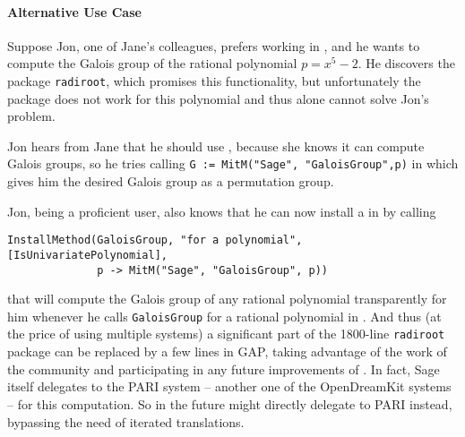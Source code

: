 \paragraph{Alternative Use Case}
Suppose Jon, one of Jane's colleagues, prefers working in \GAP, and he wants to
compute the Galois group of the rational polynomial $p = x^5 - 2$. He discovers
the \GAP package \texttt{radiroot}, which promises this functionality, but
unfortunately the package does not work for this polynomial and thus \GAP alone
cannot solve Jon's problem.

Jon hears from Jane that he should use \Sage, because she knows it can compute Galois groups, so he tries calling \lstinline|G := MitM("Sage", "GaloisGroup",p)| in \GAP which gives him the desired Galois group as a \GAP permutation group.

Jon, being a proficient \GAP user, also knows that he can now install a  in \GAP by calling 
\begin{lstlisting}
InstallMethod(GaloisGroup, "for a polynomial", [IsUnivariatePolynomial], 
              p -> MitM("Sage", "GaloisGroup", p))
\end{lstlisting}
that will compute the Galois group of any rational polynomial transparently for him whenever he calls \lstinline|GaloisGroup| for a rational polynomial in \GAP. 
And thus (at the price of using multiple systems) a significant part of the 1800-line \lstinline|radiroot| package can be replaced by a few lines in GAP, taking advantage of the work of the \Sage community and participating in any future improvements of \Sage. 
In fact, Sage itself delegates to the PARI system -- another one of the OpenDreamKit systems -- for this computation.  So in the future \GAP might directly delegate to PARI instead, bypassing the need of iterated translations.



